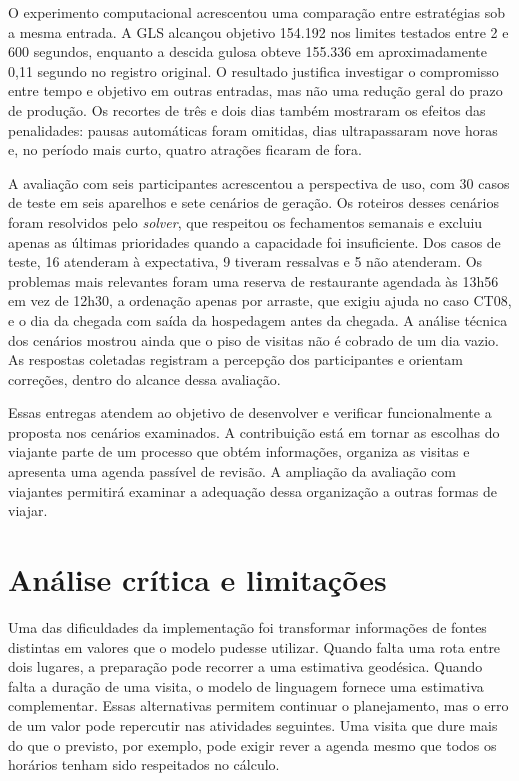 O experimento computacional acrescentou uma comparação entre estratégias sob a mesma entrada. A GLS alcançou objetivo 154.192 nos limites testados entre 2 e 600 segundos, enquanto a descida gulosa obteve 155.336 em aproximadamente 0,11 segundo no registro original. O resultado justifica investigar o compromisso entre tempo e objetivo em outras entradas, mas não uma redução geral do prazo de produção. Os recortes de três e dois dias também mostraram os efeitos das penalidades: pausas automáticas foram omitidas, dias ultrapassaram nove horas e, no período mais curto, quatro atrações ficaram de fora.

A avaliação com seis participantes acrescentou a perspectiva de uso, com 30 casos de teste em seis aparelhos e sete cenários de geração. Os roteiros desses cenários foram resolvidos pelo \textit{solver}, que respeitou os fechamentos semanais e excluiu apenas as últimas prioridades quando a capacidade foi insuficiente. Dos casos de teste, 16 atenderam à expectativa, 9 tiveram ressalvas e 5 não atenderam. Os problemas mais relevantes foram uma reserva de restaurante agendada às 13h56 em vez de 12h30, a ordenação apenas por arraste, que exigiu ajuda no caso CT08, e o dia da chegada com saída da hospedagem antes da chegada. A análise técnica dos cenários mostrou ainda que o piso de visitas não é cobrado de um dia vazio. As respostas coletadas registram a percepção dos participantes e orientam correções, dentro do alcance dessa avaliação.

Essas entregas atendem ao objetivo de desenvolver e verificar funcionalmente a proposta nos cenários examinados. A contribuição está em tornar as escolhas do viajante parte de um processo que obtém informações, organiza as visitas e apresenta uma agenda passível de revisão. A ampliação da avaliação com viajantes permitirá examinar a adequação dessa organização a outras formas de viajar.

\section{Análise crítica e limitações}

Uma das dificuldades da implementação foi transformar informações de fontes distintas em valores que o modelo pudesse utilizar. Quando falta uma rota entre dois lugares, a preparação pode recorrer a uma estimativa geodésica. Quando falta a duração de uma visita, o modelo de linguagem fornece uma estimativa complementar. Essas alternativas permitem continuar o planejamento, mas o erro de um valor pode repercutir nas atividades seguintes. Uma visita que dure mais do que o previsto, por exemplo, pode exigir rever a agenda mesmo que todos os horários tenham sido respeitados no cálculo.

